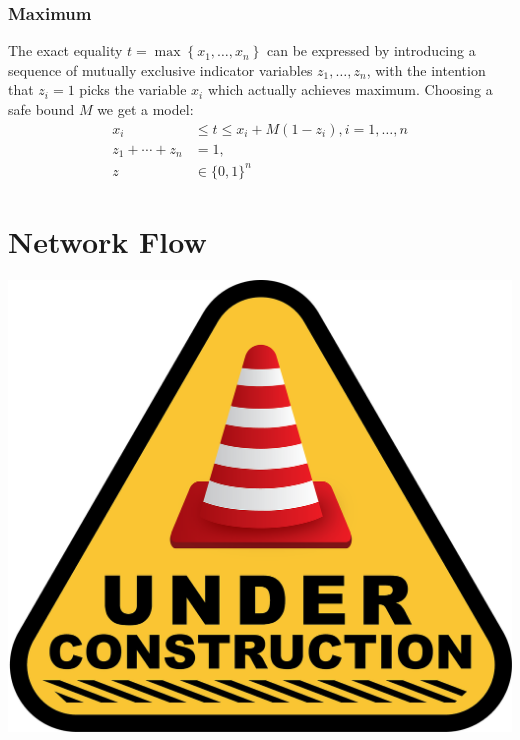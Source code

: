 \begin{enumerate}
\subsubsection{Maximum}
The exact equality $t=\max \left\{x_{1}, \ldots, x_{n}\right\}$ can be expressed by introducing a sequence of mutually exclusive indicator variables $z_{1}, \ldots, z_{n}$, with the intention that $z_{i}=1$ picks the variable $x_{i}$ which actually achieves maximum. Choosing a safe bound $M$ we get a model:
$$
\begin{aligned}
x_{i} & \leq t \leq x_{i}+M\left(1-z_{i}\right), i=1, \ldots, n \\
z_{1}+\cdots+z_{n} &=1, \\
z & \in\{0,1\}^{n}
\end{aligned}
$$









\section{Network Flow}
\begin{center}
\href{https://pixabay.com/illustrations/under-construction-construction-sign-2408060/}{\includegraphics[scale = 0.05]{optimization/figures/under-construction-2408060_1280}}
\end{center}

\end{enumerate}
